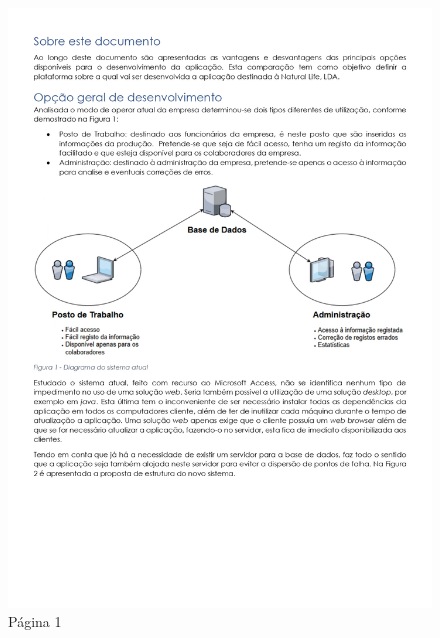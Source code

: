 \begin{figure}[H]
	\centering
	\includegraphics[width=\linewidth, frame]{figuras/Alternativas/pag1.jpg}
	\caption{Página 1}
	\label{fig:anexo_a_1}
\end{figure}
\newpage

